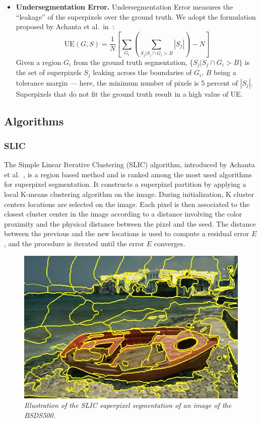 \documentclass{article}
\begin{document}
\begin{itemize}
            \item \textbf{Undersegmentation Error.} Undersegmentation Error measures the ``leakage'' of the superpixels over the ground truth. We adopt the formulation proposed by Achanta et al.~in~\cite{achanta2012}:
            $$
            \mathrm{UE}(G,S)=\frac{1}{N} \left[\sum_{G_i} \left(\sum_{S_j | S_j \cap G_i>B}|S_j|\right)-N\right]
            $$
            Given a region $G_i$ from the ground truth segmentation, $\{S_j | S_j \cap G_i>B\}$ is the set of superpixels $S_j$ leaking across the boundaries of $G_i$, $B$ being a tolerance margin --- here, the minimum number of pixels is 5 percent of $|S_j|$. Superpixels that do not fit the ground truth result in a high value of UE.
        \end{itemize}

    \subsection{Algorithms}
        \subsubsection{SLIC}
            The Simple Linear Iterative Clustering (SLIC) algorithm, introduced by Achanta et al.~\cite{achanta2012,achanta2017}, is a region based method and is ranked among the most used algorithms for superpixel segmentation. It constructs a superpixel partition by applying a local K-means clustering algorithm on the image. During initialization, K cluster centers locations are selected on the image. Each pixel is then associated to the closest cluster center in the image according to a distance involving the color proximity and the physical distance between the pixel and the seed. The distance between the previous and the new locations is used to compute a residual error $E$, and the procedure is iterated until the error $E$ converges.

            \begin{figure}[!ht]
                \centering
                \includegraphics[width=.5\linewidth]{pics/slic.png}
                \caption{\textit{Illustration of the SLIC superpixel segmentation of an image of the BSDS500.}}
            \end{figure}
\end{document}

